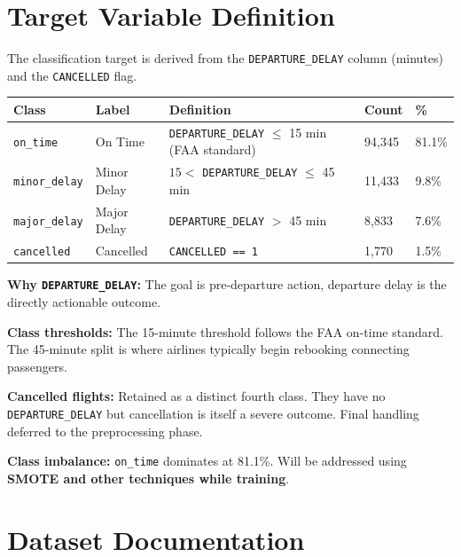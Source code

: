 \documentclass{article}
\newcommand{\code}[1]{\texttt{\small #1}}
\begin{document}
\newpage
\section{\textcolor{accentblue}{Target Variable Definition}}

The classification target is derived from the \code{DEPARTURE\_DELAY} column (minutes) and the \code{CANCELLED} flag.

\vspace{0.3em}
\begin{tcolorbox}[mainbox, title={Class Distribution}]
\renewcommand{\arraystretch}{1.4}
\begin{tabularx}{\textwidth}{L{2.5cm} L{2.8cm} X C{1.8cm} C{1.2cm}}
    \toprule
    \textbf{Class} & \textbf{Label} & \textbf{Definition} & \textbf{Count} & \textbf{\%} \\
    \midrule
    \code{on\_time}     & On Time     & \code{DEPARTURE\_DELAY} $\leq$ 15 min (FAA standard) & 94,345 & 81.1\% \\
    \code{minor\_delay} & Minor Delay & $15 <$ \code{DEPARTURE\_DELAY} $\leq$ 45 min          & 11,433 &  9.8\% \\
    \code{major\_delay} & Major Delay & \code{DEPARTURE\_DELAY} $>$ 45 min                    &  8,833 &  7.6\% \\
    \code{cancelled}    & Cancelled   & \code{CANCELLED == 1}                                  &  1,770 &  1.5\% \\
    \bottomrule
\end{tabularx}
\end{tcolorbox}

\textbf{Why \code{DEPARTURE\_DELAY}:} The goal is pre-departure action, departure delay is the directly actionable outcome.

\textbf{Class thresholds:} The 15-minute threshold follows the FAA on-time standard. The 45-minute split is where airlines typically begin rebooking connecting passengers.

\textbf{Cancelled flights:} Retained as a distinct fourth class. They have no \code{DEPARTURE\_DELAY} but cancellation is itself a severe outcome. Final handling deferred to the preprocessing phase.

\textbf{Class imbalance:} \code{on\_time} dominates at 81.1\%. Will be addressed using \textbf{SMOTE and other techniques while training}.

\section{\textcolor{accentblue}{Dataset Documentation}}
\end{document}
